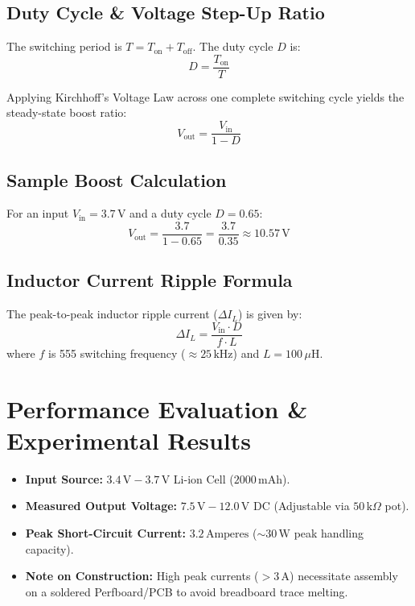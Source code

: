 \documentclass[11pt,a4paper]{article}
\begin{document}
\subsection{Duty Cycle \& Voltage Step-Up Ratio}
The switching period is $T = T_{\text{on}} + T_{\text{off}}$. The duty cycle $D$ is:
\begin{equation}
D = \frac{T_{\text{on}}}{T}
\end{equation}

Applying Kirchhoff's Voltage Law across one complete switching cycle yields the steady-state boost ratio:
\begin{equation}
V_{\text{out}} = \frac{V_{\text{in}}}{1 - D}
\end{equation}

\subsection{Sample Boost Calculation}
For an input $V_{\text{in}} = 3.7\,\text{V}$ and a duty cycle $D = 0.65$:
\[
V_{\text{out}} = \frac{3.7}{1 - 0.65} = \frac{3.7}{0.35} \approx 10.57\,\text{V}
\]

\subsection{Inductor Current Ripple Formula}
The peak-to-peak inductor ripple current ($\Delta I_L$) is given by:
\begin{equation}
\Delta I_L = \frac{V_{\text{in}} \cdot D}{f \cdot L}
\end{equation}
where $f$ is 555 switching frequency ($\approx 25\,\text{kHz}$) and $L = 100\,\mu\text{H}$.

\section{Performance Evaluation \& Experimental Results}
\begin{itemize}
    \item \textbf{Input Source:} $3.4\,\text{V} - 3.7\,\text{V}$ Li-ion Cell ($2000\,\text{mAh}$).
    \item \textbf{Measured Output Voltage:} $7.5\,\text{V} - 12.0\,\text{V}$ DC (Adjustable via $50\,\text{k}\Omega$ pot).
    \item \textbf{Peak Short-Circuit Current:} $3.2\,\text{Amperes}$ ($\sim 30\,\text{W}$ peak handling capacity).
    \item \textbf{Note on Construction:} High peak currents ($>3\,\text{A}$) necessitate assembly on a soldered Perfboard/PCB to avoid breadboard trace melting.
\end{itemize}
\end{document}
